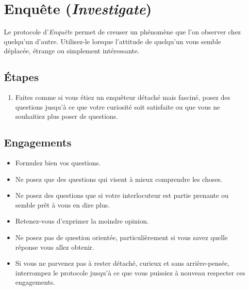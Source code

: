 \documentclass[paper=6in:9in,pagesize=pdftex,headinclude=on,footinclude=on,11pt]{scrbook}
\let\oldsection\section
\renewcommand\section{\clearpage\oldsection}
\begin{document}
\section{Enquête (\emph{Investigate})} \label{protocole-enquete}

Le protocole d'\emph{Enquête} permet de creuser un phénomène que l'on observer chez quelqu'un d'autre. Utilisez-le lorsque l'attitude de quelqu'un vous
semble déplacée, étrange ou simplement intéressante.

\subsection{Étapes}
\begin{enumerate}
	\item Faites comme si vous étiez un enquêteur détaché mais fasciné, posez des questions jusqu'à ce que votre curiosité soit satisfaite ou que vous
	      ne souhaitiez plus poser de questions.
\end{enumerate}

\subsection{Engagements}
\begin{itemize}
	\item Formulez bien vos questions.
	\item Ne posez que des questions qui visent à mieux comprendre les choses.
	\item Ne posez des questions que si votre interlocuteur est partie prenante ou semble prêt à vous en dire plus.
	\item Retenez-vous d'exprimer la moindre opinion.
	\item Ne posez pas de question orientée, particulièrement si vous savez quelle réponse vous allez obtenir.
	\item Si vous ne parvenez pas à rester détaché, curieux et sans arrière-pensée, interrompez le protocole jusqu'à ce que vous puissiez à nouveau
	      respecter ces engagements.
\end{itemize}
\end{document}

